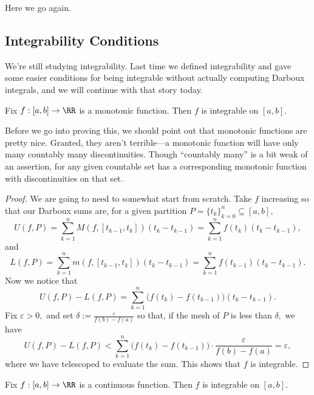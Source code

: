 \documentclass[../notes.tex]{subfiles}
\begin{document}

















Here we go again.

\subsection{Integrability Conditions}
We're still studying integrability. Last time we defined integrability and gave some easier conditions for being integrable without actually computing Darboux integrals, and we will continue with that story today.
\begin{proposition}
	Fix $f:[a,b]\to\RR$ is a monotonic function. Then $f$ is integrable on $[a,b].$
\end{proposition}
Before we go into proving this, we should point out that monotonic functions are pretty nice. Granted, they aren't terrible---a monotonic function will have only many countably many discontinuities.\todo{} Though ``countably many'' is a bit weak of an assertion, for any given countable set has a corresponding monotonic function with discontinuities on that set.
\begin{proof}
	We are going to need to somewhat start from scratch. Take $f$ increasing so that our Darboux sums are, for a given partition $P=\{t_k\}_{k=0}^n\subseteq[a,b],$
	\[U(f,P)=\sum_{k=1}^nM(f,[t_{k-1},t_k])(t_k-t_{k-1})=\sum_{k=1}^nf(t_k)(t_k-t_{k-1}),\]
	and
	\[L(f,P)=\sum_{k=1}^nm(f,[t_{k-1},t_k])(t_k-t_{k-1})=\sum_{k=1}^nf(t_{k-1})(t_k-t_{k-1}).\]
	Now we notice that
	\[U(f,P)-L(f,P)=\sum_{k=1}^n\big(f(t_k)-f(t_{k-1})\big)(t_k-t_{k-1}).\]
	Fix $\varepsilon>0,$ and set $\delta:=\frac{\varepsilon}{f(b)-f(a)}$ so that, if the mesh of $P$ is less than $\delta,$ we have
	\[U(f,P)-L(f,P)<\sum_{k=1}^n\big(f(t_k)-f(t_{k-1})\big)\cdot\frac{\varepsilon}{f(b)-f(a)}=\varepsilon,\]
	where we have telescoped to evaluate the sum. This shows that $f$ is integrable.
\end{proof}
\begin{prop}
	Fix $f:[a,b]\to\RR$ is a continuous function. Then $f$ is integrable on $[a,b].$
\end{prop}
\end{document}
